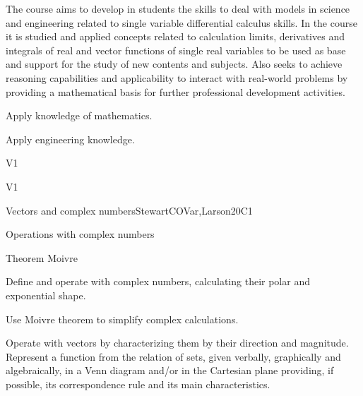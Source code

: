 \begin{syllabus}


\begin{justification}
The course aims to develop in students the skills to deal with models in science and engineering related to single variable differential calculus skills. In the course it is studied and applied concepts related to calculation limits, derivatives and integrals of real and vector functions of single real variables to be used as base and support for the study of new contents and subjects. 
Also seeks to achieve reasoning capabilities and applicability to interact with real-world problems by providing a mathematical basis for further professional development activities.
\end{justification}

\begin{goals}
\item Apply knowledge of mathematics.
\item Apply engineering knowledge.

\end{goals}

\begin{outcomes}{V1}
   \item {}
   \item {}
\end{outcomes}

\begin{competences}{V1}
   \item {}
   \item {}
   \item {}
\end{competences}

\begin{unit}{Vectors and complex numbers}{}{StewartCOVar,Larson}{20}{C1}
   \begin{topics}
      \item Operations with complex numbers
      \item Theorem Moivre \textquotesingle 
   \end{topics}

   \begin{learningoutcomes}
      \item  Define and operate with complex numbers, calculating their polar and exponential shape.
      \item  Use Moivre theorem \textquotesingle to simplify complex calculations.
      \item Operate with vectors by characterizing them by their direction and magnitude.  Represent a function from the relation of sets, given verbally, graphically and algebraically, in a Venn diagram and/or in the Cartesian plane providing, if possible, its correspondence rule and its main characteristics.
   \end{learningoutcomes}
\end{unit}


\end{syllabus}
